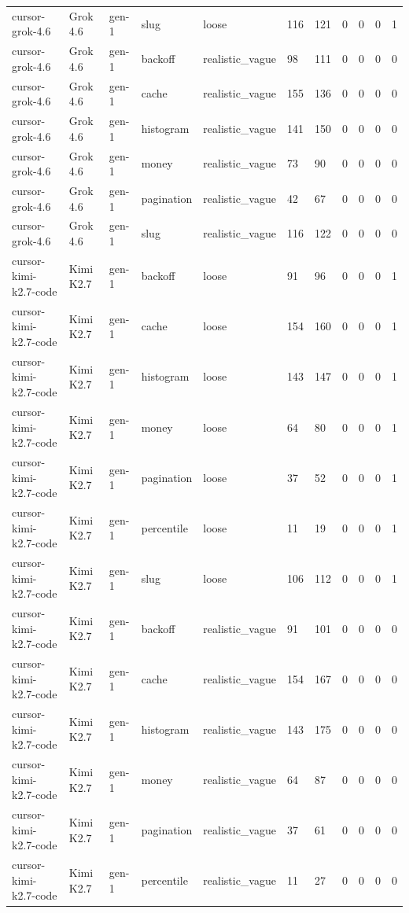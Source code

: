 \begin{tabular}{lllllllllll}
cursor-grok-4.6 & Grok 4.6 & gen-1 & slug & loose & 116 & 121 & 0 & 0 & 0 & 1 \\
cursor-grok-4.6 & Grok 4.6 & gen-1 & backoff & realistic\_vague & 98 & 111 & 0 & 0 & 0 & 0 \\
cursor-grok-4.6 & Grok 4.6 & gen-1 & cache & realistic\_vague & 155 & 136 & 0 & 0 & 0 & 0 \\
cursor-grok-4.6 & Grok 4.6 & gen-1 & histogram & realistic\_vague & 141 & 150 & 0 & 0 & 0 & 0 \\
cursor-grok-4.6 & Grok 4.6 & gen-1 & money & realistic\_vague & 73 & 90 & 0 & 0 & 0 & 0 \\
cursor-grok-4.6 & Grok 4.6 & gen-1 & pagination & realistic\_vague & 42 & 67 & 0 & 0 & 0 & 0 \\
cursor-grok-4.6 & Grok 4.6 & gen-1 & slug & realistic\_vague & 116 & 122 & 0 & 0 & 0 & 0 \\
cursor-kimi-k2.7-code & Kimi K2.7 & gen-1 & backoff & loose & 91 & 96 & 0 & 0 & 0 & 1 \\
cursor-kimi-k2.7-code & Kimi K2.7 & gen-1 & cache & loose & 154 & 160 & 0 & 0 & 0 & 1 \\
cursor-kimi-k2.7-code & Kimi K2.7 & gen-1 & histogram & loose & 143 & 147 & 0 & 0 & 0 & 1 \\
cursor-kimi-k2.7-code & Kimi K2.7 & gen-1 & money & loose & 64 & 80 & 0 & 0 & 0 & 1 \\
cursor-kimi-k2.7-code & Kimi K2.7 & gen-1 & pagination & loose & 37 & 52 & 0 & 0 & 0 & 1 \\
cursor-kimi-k2.7-code & Kimi K2.7 & gen-1 & percentile & loose & 11 & 19 & 0 & 0 & 0 & 1 \\
cursor-kimi-k2.7-code & Kimi K2.7 & gen-1 & slug & loose & 106 & 112 & 0 & 0 & 0 & 1 \\
cursor-kimi-k2.7-code & Kimi K2.7 & gen-1 & backoff & realistic\_vague & 91 & 101 & 0 & 0 & 0 & 0 \\
cursor-kimi-k2.7-code & Kimi K2.7 & gen-1 & cache & realistic\_vague & 154 & 167 & 0 & 0 & 0 & 0 \\
cursor-kimi-k2.7-code & Kimi K2.7 & gen-1 & histogram & realistic\_vague & 143 & 175 & 0 & 0 & 0 & 0 \\
cursor-kimi-k2.7-code & Kimi K2.7 & gen-1 & money & realistic\_vague & 64 & 87 & 0 & 0 & 0 & 0 \\
cursor-kimi-k2.7-code & Kimi K2.7 & gen-1 & pagination & realistic\_vague & 37 & 61 & 0 & 0 & 0 & 0 \\
cursor-kimi-k2.7-code & Kimi K2.7 & gen-1 & percentile & realistic\_vague & 11 & 27 & 0 & 0 & 0 & 0 \\

\end{tabular}
